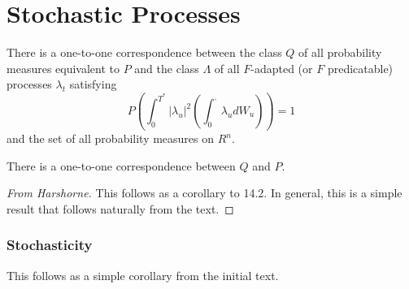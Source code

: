 \chapter{Stochastic Processes}

\begin{defn}
  There is a one-to-one correspondence between the class $Q$ of all
  probability measures equivalent to $P$ and the class $\Lambda$ of
  all $F$-adapted (or $F$ predicatable) processes $\lambda_{t}$
  satisfying
  \begin{equation}
    P \left(\int_{0}^{T^{*}} |\lambda_{u}|^{2} \left(\int_{0}^{\cdot}
        \lambda_{u} dW_{u} \right) \right) = 1
  \end{equation}
  and the set of all probability measures on $R^{n}$.
\end{defn}


\begin{thm}
  There is a one-to-one correspondence between $Q$ and $P$. 
\end{thm}

\begin{proof}[From Harshorne]
  This follows as a corollary to 14.2.  In general, this is a simple
  result that follows naturally from the text.

\end{proof}

\subsection{Stochasticity}

This follows as a simple corollary from the initial text.